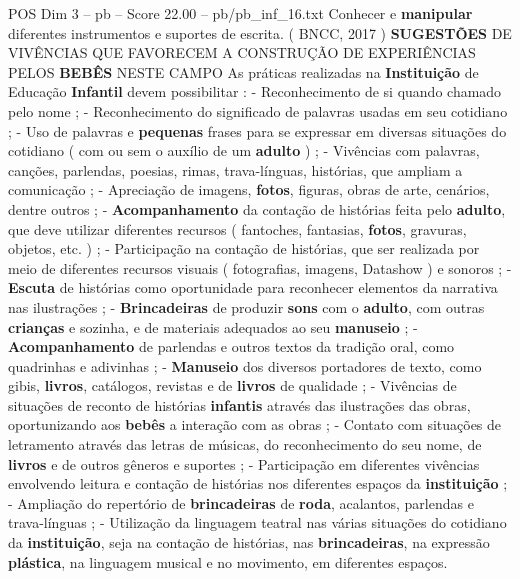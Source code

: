 \begin{textsample}{POS Dim 3 – pb – Score 22.00 – pb/pb\_inf\_16.txt}
Conhecer e \textbf{manipular} diferentes instrumentos e suportes de escrita. ( BNCC, 2017 ) \textbf{SUGESTÕES} DE VIVÊNCIAS QUE FAVORECEM A CONSTRUÇÃO DE EXPERIÊNCIAS PELOS \textbf{BEBÊS} NESTE CAMPO As práticas realizadas na \textbf{Instituição} de Educação \textbf{Infantil} devem possibilitar : - Reconhecimento de si quando chamado pelo nome ; - Reconhecimento do significado de palavras usadas em seu cotidiano ; - Uso de palavras e \textbf{pequenas} frases para se expressar em diversas situações do cotidiano ( com ou sem o auxílio de um \textbf{adulto} ) ; - Vivências com palavras, canções, parlendas, poesias, rimas, trava-línguas, histórias, que ampliam a comunicação ; - Apreciação de imagens, \textbf{fotos}, figuras, obras de arte, cenários, dentre outros ; - \textbf{Acompanhamento} da contação de histórias feita pelo \textbf{adulto}, que deve utilizar diferentes recursos ( fantoches, fantasias, \textbf{fotos}, gravuras, objetos, etc. ) ; - Participação na contação de histórias, que ser realizada por meio de diferentes recursos visuais ( fotografias, imagens, Datashow ) e sonoros ; - \textbf{Escuta} de histórias como oportunidade para reconhecer elementos da narrativa nas ilustrações ; - \textbf{Brincadeiras} de produzir \textbf{sons} com o \textbf{adulto}, com outras \textbf{crianças} e sozinha, e de materiais adequados ao seu \textbf{manuseio} ; - \textbf{Acompanhamento} de parlendas e outros textos da tradição oral, como quadrinhas e adivinhas ; - \textbf{Manuseio} dos diversos portadores de texto, como gibis, \textbf{livros}, catálogos, revistas e de \textbf{livros} de qualidade ; - Vivências de situações de reconto de histórias \textbf{infantis} através das ilustrações das obras, oportunizando aos \textbf{bebês} a interação com as obras ; - Contato com situações de letramento através das letras de músicas, do reconhecimento do seu nome, de \textbf{livros} e de outros gêneros e suportes ; - Participação em diferentes vivências envolvendo leitura e contação de histórias nos diferentes espaços da \textbf{instituição} ; - Ampliação do repertório de \textbf{brincadeiras} de \textbf{roda}, acalantos, parlendas e trava-línguas ; - Utilização da linguagem teatral nas várias situações do cotidiano da \textbf{instituição}, seja na contação de histórias, nas \textbf{brincadeiras}, na expressão \textbf{plástica}, na linguagem musical e no movimento, em diferentes espaços.

\end{textsample}
